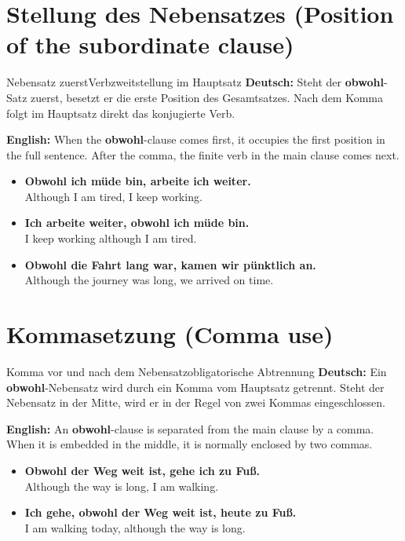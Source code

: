 \documentclass[a4paper,11pt]{article}
\newcommand{\GermanText}[1]{\textbf{Deutsch: }#1\par}
\newcommand{\EnglishText}[1]{{\small\color{SoftGray}\textbf{English: }#1\par}}
\newcommand{\ExampleItem}[2]{\item \textbf{#1}\\{\small\color{SoftGray}#2}}
\begin{document}
\section{Stellung des Nebensatzes \textnormal{(Position of the subordinate clause)}}
\begin{grammarentry}{Nebensatz zuerst}{Verbzweitstellung im Hauptsatz}
\GermanText{Steht der \textbf{obwohl}-Satz zuerst, besetzt er die erste Position des Gesamtsatzes. Nach dem Komma folgt im Hauptsatz direkt das konjugierte Verb.}
\EnglishText{When the \textbf{obwohl}-clause comes first, it occupies the first position in the full sentence. After the comma, the finite verb in the main clause comes next.}
\end{grammarentry}
\begin{exbox}\begin{itemize}
\ExampleItem{Obwohl ich müde bin, arbeite ich weiter.}{Although I am tired, I keep working.}
\ExampleItem{Ich arbeite weiter, obwohl ich müde bin.}{I keep working although I am tired.}
\ExampleItem{Obwohl die Fahrt lang war, kamen wir pünktlich an.}{Although the journey was long, we arrived on time.}
\end{itemize}\end{exbox}

\section{Kommasetzung \textnormal{(Comma use)}}
\begin{grammarentry}{Komma vor und nach dem Nebensatz}{obligatorische Abtrennung}
\GermanText{Ein \textbf{obwohl}-Nebensatz wird durch ein Komma vom Hauptsatz getrennt. Steht der Nebensatz in der Mitte, wird er in der Regel von zwei Kommas eingeschlossen.}
\EnglishText{An \textbf{obwohl}-clause is separated from the main clause by a comma. When it is embedded in the middle, it is normally enclosed by two commas.}
\end{grammarentry}
\begin{exbox}\begin{itemize}
\ExampleItem{Obwohl der Weg weit ist, gehe ich zu Fuß.}{Although the way is long, I am walking.}
\ExampleItem{Ich gehe, obwohl der Weg weit ist, heute zu Fuß.}{I am walking today, although the way is long.}
\end{itemize}\end{exbox}
\end{document}
